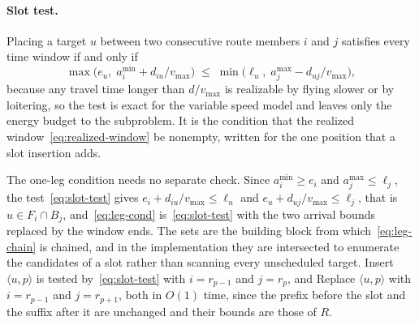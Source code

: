 \documentclass[11pt]{article}
\begin{document}
\paragraph{Slot test.}
Placing a target $u$ between two consecutive route members $i$ and $j$ satisfies every time window if and only if
\begin{equation}\label{eq:slot-test}
    \max\!\bigl( e_u,\; a^{\min}_i + d_{iu} / v_{\max} \bigr)
    \;\le\;
    \min\!\bigl( \ell_u,\; a^{\max}_j - d_{uj} / v_{\max} \bigr),
\end{equation}
because any travel time longer than $d / v_{\max}$ is realizable by flying slower or by loitering, so the test is exact for the variable speed model and leaves only the energy budget to the subproblem. It is the condition that the realized window~\eqref{eq:realized-window} be nonempty, written for the one position that a slot insertion adds.

The one-leg condition needs no separate check. Since $a^{\min}_i \ge e_i$ and $a^{\max}_j \le \ell_j$, the test~\eqref{eq:slot-test} gives $e_i + d_{iu}/v_{\max} \le \ell_u$ and $e_u + d_{uj}/v_{\max} \le \ell_j$, that is $u \in F_i \cap B_j$, and~\eqref{eq:leg-cond} is~\eqref{eq:slot-test} with the two arrival bounds replaced by the window ends. The sets are the building block from which~\eqref{eq:leg-chain} is chained, and in the implementation they are intersected to enumerate the candidates of a slot rather than scanning every unscheduled target. Insert $\langle u, p \rangle$ is tested by~\eqref{eq:slot-test} with $i = r_{p-1}$ and $j = r_p$, and Replace $\langle u, p \rangle$ with $i = r_{p-1}$ and $j = r_{p+1}$, both in $O(1)$ time, since the prefix before the slot and the suffix after it are unchanged and their bounds are those of $R$.
\end{document}
